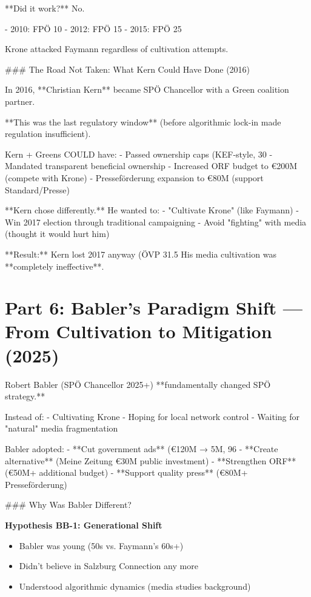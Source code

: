 **Did it work?** No.

- 2010: FPÖ 10%
- 2012: FPÖ 15%
- 2015: FPÖ 25%

Krone attacked Faymann regardless of cultivation attempts.

### The Road Not Taken: What Kern Could Have Done (2016)

In 2016, **Christian Kern** became SPÖ Chancellor with a Green coalition partner.

**This was the last regulatory window** (before algorithmic lock-in made regulation insufficient).

Kern + Greens COULD have:
- Passed ownership caps (KEF-style, 30%
- Mandated transparent beneficial ownership
- Increased ORF budget to €200M (compete with Krone)
- Presseförderung expansion to €80M (support Standard/Presse)

**Kern chose differently.** He wanted to:
- "Cultivate Krone" (like Faymann)
- Win 2017 election through traditional campaigning
- Avoid "fighting" with media (thought it would hurt him)

**Result:** Kern lost 2017 anyway (ÖVP 31.5%
His media cultivation was **completely ineffective**.


\section*{Part 6: Babler's Paradigm Shift --- From Cultivation to Mitigation (2025)}

Robert Babler (SPÖ Chancellor 2025+) **fundamentally changed SPÖ strategy.**

Instead of:
- Cultivating Krone
- Hoping for local network control
- Waiting for "natural" media fragmentation

Babler adopted:
- **Cut government ads** (€120M → 5M, 96%
- **Create alternative** (Meine Zeitung €30M public investment)
- **Strengthen ORF** (€50M+ additional budget)
- **Support quality press** (€80M+ Presseförderung)

### Why Was Babler Different?

\textbf{Hypothesis BB-1: Generational Shift}
\begin{itemize}
\item Babler was young (50s vs. Faymann's 60s+)
\item Didn't believe in Salzburg Connection any more
\item Understood algorithmic dynamics (media studies background)
\end{itemize}

